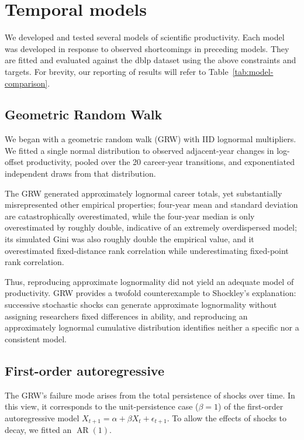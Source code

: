 \documentclass[9pt,twocolumn,twoside]{pnas-new}
\begin{document}
\section*{Temporal models}\label{sec:model} 
We developed and tested several models of scientific productivity. Each model was developed in response to observed shortcomings in preceding models. They are fitted and evaluated against the dblp dataset using the above constraints and targets. For brevity, our reporting of results will refer to Table~\ref{tab:model-comparison}.


\subsection*{Geometric Random Walk}\label{subsec:model_GRW}
We began with a geometric random walk (GRW) with IID lognormal multipliers. We fitted a single normal distribution to observed adjacent-year changes in log-offset productivity, pooled over the 20 career-year transitions, and exponentiated independent draws from that distribution.

The GRW generated approximately lognormal career totals, yet substantially misrepresented other empirical properties; four-year mean and standard deviation are catastrophically overestimated, while the four-year median is only overestimated by roughly double, indicative of an extremely overdispersed model; its simulated Gini was also roughly double the empirical value, and it overestimated fixed-distance rank correlation while underestimating fixed-point rank correlation.

Thus, reproducing approximate lognormality did not yield an adequate model of productivity. GRW provides a twofold counterexample to Shockley's explanation: successive stochastic shocks can generate approximate lognormality without assigning researchers fixed differences in ability, and reproducing an approximately lognormal cumulative distribution identifies neither a specific nor a consistent model. 

\subsection*{First-order autoregressive}\label{subsec_model_AR1}
The GRW's failure mode arises from the total persistence of shocks over time. In this view, it corresponds to the unit-persistence case ($\beta=1$) of the first-order autoregressive model $X_{t+1}=\alpha+\beta X_t+\epsilon_{t+1}$. To allow the effects of shocks to decay, we fitted an $\operatorname{AR}(1)$.
\end{document}
